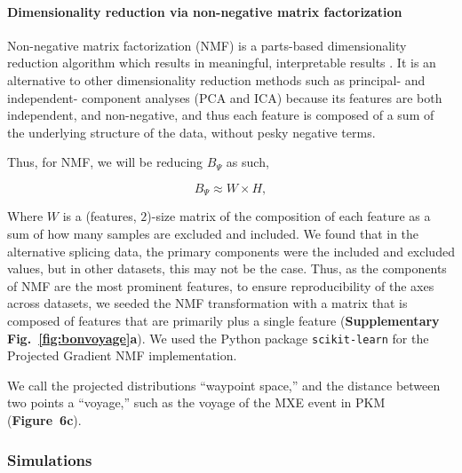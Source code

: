 \paragraph{Dimensionality reduction via non-negative matrix factorization}

Non-negative matrix factorization (NMF) is a parts-based dimensionality reduction algorithm which results in meaningful, interpretable results \cite{Lee:1999gw}. It is an alternative to other dimensionality reduction methods such as principal- and independent- component analyses (PCA and ICA) because its features are both independent, and non-negative, and thus each feature is composed of a sum of the underlying structure of the data, without pesky negative terms.

Thus, for NMF, we will be reducing $B_\Psi$ as such,

\begin{equation}
B_\Psi \approx W \times H,
\end{equation}

Where $W$ is a (features, $2$)-size matrix of the composition of each feature as a sum of how many samples are excluded and included. We found that in the alternative splicing data, the primary components were the included and excluded values, but in other datasets, this may not be the case. Thus, as the components of NMF are the most prominent features, to ensure reproducibility of the axes across datasets, we seeded the NMF transformation with a matrix that is composed of features that are primarily \0 plus a single \1 feature (\textbf{Supplementary Fig.~\ref{fig:bonvoyage}a}). We used the Python package \texttt{scikit-learn} \cite{Pedregosa:2011tv} for the Projected Gradient NMF implementation. 

We call the projected distributions ``waypoint space,'' and the distance between two points a ``voyage,'' such as the voyage of the MXE event in PKM (\textbf{Figure~6c}). 


\subsubsection{Simulations}
\label{subsubsec:bonvoyage_simulations}

